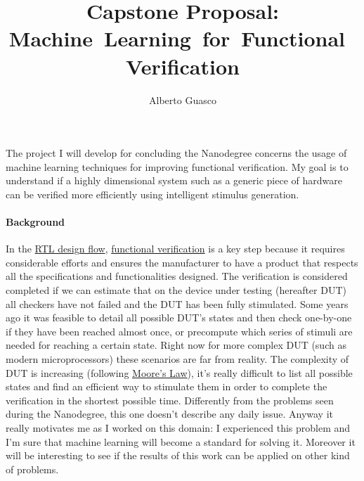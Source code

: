 \documentclass{article}
\title{Capstone Proposal: Machine~Learning~for~Functional~Verification}
\author{Alberto Guasco}
\begin{document}
 
\maketitle

The project I will develop for concluding the Nanodegree concerns the usage of machine learning techniques for improving functional verification. My goal is to understand if a highly dimensional system such as a generic piece of hardware can be verified more efficiently using intelligent stimulus generation.
 
\paragraph*{Background}


In the \href{http://www.asic-world.com/verilog/design_flow1.html}{RTL design flow}, \href{https://en.wikipedia.org/wiki/Functional_verification}{functional verification} is a key step  because it requires considerable efforts and ensures the manufacturer to have a product that respects all the specifications and functionalities designed. The verification is considered completed if we can estimate that on the device under testing (hereafter DUT) all checkers have not failed and the DUT has been fully stimulated. Some years ago it was feasible to detail all possible DUT's states and then check one-by-one if they have been reached almost once, or precompute which series of stimuli are needed for reaching a certain state. Right now for more complex DUT (such as modern microprocessors) these scenarios are far from reality. The complexity of DUT is increasing (following \href{https://en.wikipedia.org/wiki/Moore%27s_law}{Moore's Law}), it's really difficult to list all possible states and find an efficient way to stimulate them in order to complete the verification in the shortest possible time.
Differently from the problems seen during the Nanodegree, this one doesn't describe any daily issue. Anyway it really motivates me as I worked on this domain: I experienced this problem and I'm sure that machine learning will become a standard for solving it. Moreover it will be interesting to see if the results of this work can be applied on other kind of problems.
\end{document}
